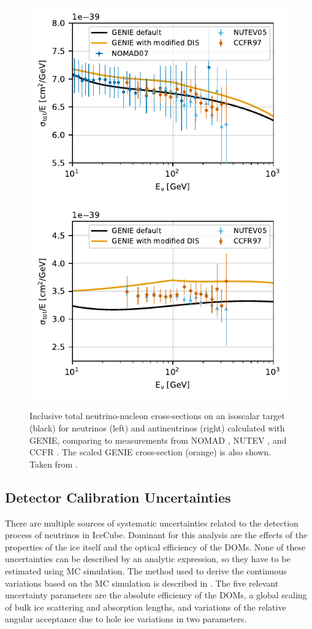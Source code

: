 \begin{figure}
    \centering 
    \includegraphics[width=0.49\linewidth]{figures/simulation_and_processing/cross_sections/NuMu_CC_iso_comp_to_data__upd_style.pdf}
    \includegraphics[width=0.49\linewidth]{figures/simulation_and_processing/cross_sections/NuMu_Bar_CC_iso_comp_to_data__upd_style.pdf}
    
    \caption[Inclusive total neutrino-nucleon cross-sections]{Inclusive total neutrino-nucleon cross-sections on an isoscalar target (black) for neutrinos (left) and antineutrinos (right) calculated with GENIE, comparing to measurements from NOMAD \cite{xsec_data_nomad}, NUTEV \cite{xsec_data_nutev}, and CCFR \cite{xsec_data_ccfr}. The scaled GENIE cross-section (orange) is also shown. Taken from \cite{OVS_PRD}.}
\end{figure}


\subsection{Detector Calibration Uncertainties}

There are multiple sources of systematic uncertainties related to the detection process of neutrinos in IceCube. Dominant for this analysis are the effects of the properties of the ice itself and the optical efficiency of the DOMs. None of these uncertainties can be described by an analytic expression, so they have to be estimated using MC simulation. The method used to derive the continuous variations based on the MC simulation is described in . The five relevant uncertainty parameters are the absolute efficiency of the DOMs, a global scaling of bulk ice scattering and absorption lengths, and variations of the relative angular acceptance due to hole ice variations in two parameters.


